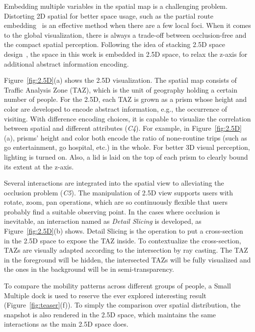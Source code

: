 Embedding multiple variables in the spatial map is a challenging problem. Distorting 2D spatial for better space usage, such as the partial route embedding~\citep{sun2016embedding} is an effective method when there are a few local foci. When it comes to the global visualization, there is always a trade-off between occlusion-free and the compact spatial perception. Following the idea of stacking 2.5D space design~\citep{Tominski2012_stacking}, the space in this work is embedded in 2.5D space, to relax the z-axis for additional abstract information encoding.

Figure~\ref{fig:2.5D}(a) shows the 2.5D visualization. The spatial map consists of Traffic Analysis Zone (TAZ), which is the unit of geography holding a certain number of people. For the 2.5D, each TAZ is grown as a prism whose height and color are developed to encode abstract information, e.g., the occurrence of visiting. With difference encoding choices, it is capable to visualize the correlation between spatial and different attributes (\textit{C4}). For example, in Figure~\ref{fig:2.5D}(a), prisms' height and color both encode the ratio of none-routine trips (such as go entertainment, go hospital, etc.) in the whole. For better 3D visual perception, lighting is turned on. Also, a lid is laid on the top of each prism to clearly bound its extent at the z-axis.

Several interactions are integrated into the spatial view to alleviating the occlusion problem (\textit{C5}). The manipulation of 2.5D view supports users with rotate, zoom, pan operations, which are so continuously flexible that users probably find a suitable observing point. In the cases where occlusion is inevitable, an interaction named as \textit{Detail Slicing} is developed, as Figure~\ref{fig:2.5D}(b) shows. Detail Slicing is the operation to put a cross-section in the 2.5D space to expose the TAZ inside. To contextualize the cross-section, TAZs are visually adapted according to the intersection by ray casting. The TAZ in the foreground will be hidden, the intersected TAZs will be fully visualized and the ones in the background will be in semi-transparency.


To compare the mobility patterns across different groups of people, a Small Multiple dock is used to reserve the ever explored interesting result (Figure~\ref{fig:teaser}(f)). To simply the comparison over spatial distribution, the snapshot is also rendered in the 2.5D space, which maintains the same interactions as the main 2.5D space does.


